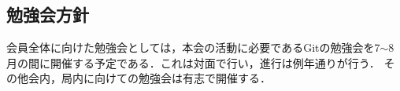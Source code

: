 \subsection*{勉強会方針}



会員全体に向けた勉強会としては，本会の活動に必要であるGitの勉強会を7$\sim$8月の間に開催する予定である．これは対面で行い，進行は例年通り\newGradeIfKouki{}\secondGrade{}が行う．
その他会内，局内に向けての勉強会は有志で開催する．
